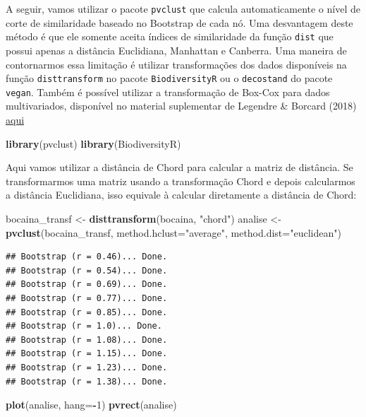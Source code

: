 \documentclass[
]{book}
\newenvironment{Shaded}{\begin{snugshade}}{\end{snugshade}}
\newcommand{\DataTypeTok}[1]{\textcolor[rgb]{0.13,0.29,0.53}{#1}}
\newcommand{\DecValTok}[1]{\textcolor[rgb]{0.00,0.00,0.81}{#1}}
\newcommand{\KeywordTok}[1]{\textcolor[rgb]{0.13,0.29,0.53}{\textbf{#1}}}
\newcommand{\NormalTok}[1]{#1}
\newcommand{\OperatorTok}[1]{\textcolor[rgb]{0.81,0.36,0.00}{\textbf{#1}}}
\newcommand{\StringTok}[1]{\textcolor[rgb]{0.31,0.60,0.02}{#1}}
\begin{document}
A seguir, vamos utilizar o pacote \texttt{pvclust} que calcula automaticamente o nível de corte de similaridade baseado no Bootstrap de cada nó. Uma desvantagem deste método é que ele somente aceita índices de similaridade da função \texttt{dist} que possui apenas a distância Euclidiana, Manhattan e Canberra. Uma maneira de contornarmos essa limitação é utilizar transformações dos dados disponíveis na função \texttt{disttransform} no pacote \texttt{BiodiversityR} ou o \texttt{decostand} do pacote \texttt{vegan}. Também é possível utilizar a transformação de Box-Cox para dados multivariados, disponível no material suplementar de Legendre \& Borcard (2018) \href{http://www.ecography.org/appendix/ecog-03498}{aqui}

\begin{Shaded}
\begin{Highlighting}[]
\KeywordTok{library}\NormalTok{(pvclust)}
\KeywordTok{library}\NormalTok{(BiodiversityR)}
\end{Highlighting}
\end{Shaded}

Aqui vamos utilizar a distância de Chord para calcular a matriz de distância. Se transformarmos uma matriz usando a transformação Chord e depois calcularmos a distância Euclidiana, isso equivale à calcular diretamente a distância de Chord:

\begin{Shaded}
\begin{Highlighting}[]
\NormalTok{bocaina_transf <-}\StringTok{ }\KeywordTok{disttransform}\NormalTok{(bocaina, }\StringTok{"chord"}\NormalTok{)}
\NormalTok{analise <-}\StringTok{ }\KeywordTok{pvclust}\NormalTok{(bocaina_transf, }\DataTypeTok{method.hclust=}\StringTok{"average"}\NormalTok{, }\DataTypeTok{method.dist=}\StringTok{"euclidean"}\NormalTok{) }
\end{Highlighting}
\end{Shaded}

\begin{verbatim}
## Bootstrap (r = 0.46)... Done.
## Bootstrap (r = 0.54)... Done.
## Bootstrap (r = 0.69)... Done.
## Bootstrap (r = 0.77)... Done.
## Bootstrap (r = 0.85)... Done.
## Bootstrap (r = 1.0)... Done.
## Bootstrap (r = 1.08)... Done.
## Bootstrap (r = 1.15)... Done.
## Bootstrap (r = 1.23)... Done.
## Bootstrap (r = 1.38)... Done.
\end{verbatim}

\begin{Shaded}
\begin{Highlighting}[]
\KeywordTok{plot}\NormalTok{(analise, }\DataTypeTok{hang=}\OperatorTok{-}\DecValTok{1}\NormalTok{)}
\KeywordTok{pvrect}\NormalTok{(analise)}
\end{Highlighting}
\end{Shaded}
\end{document}
